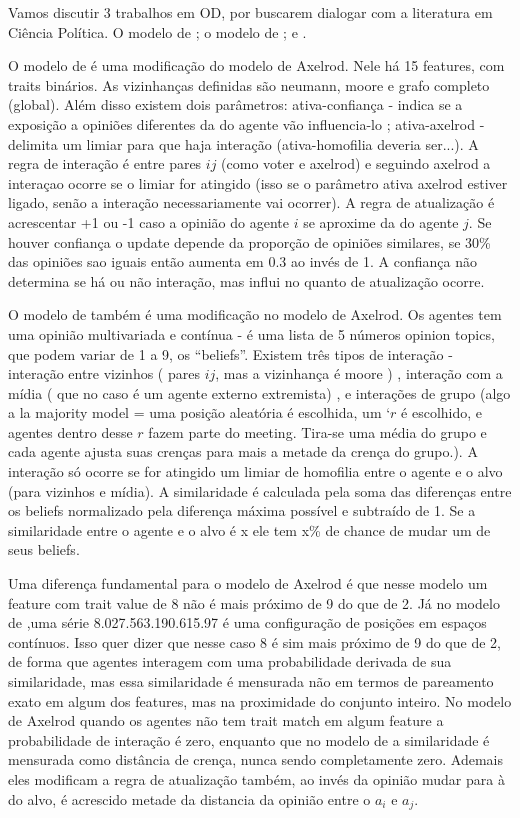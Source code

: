 Vamos discutir 3 trabalhos em OD, por buscarem dialogar com a literatura em Ciência
Política. O modelo de ; o modelo de
 ; e .


O modelo de  é uma modificação do modelo de Axelrod. Nele
há 15 features, com traits binários. As vizinhanças definidas são neumann, moore
e grafo completo (global). Além disso existem dois parâmetros: ativa-confiança -
indica se a exposição a opiniões diferentes da do agente vão influencia-lo ;
ativa-axelrod - delimita um limiar para que haja interação (ativa-homofilia
deveria ser...). A regra de interação é entre pares $ij$ (como voter e axelrod)
e seguindo axelrod a interaçao ocorre se o limiar for atingido (isso se o
parâmetro ativa axelrod estiver ligado, senão a interação necessariamente vai
ocorrer). A regra de atualização é acrescentar +1 ou -1 caso a opinião do agente
$i$ se aproxime da do agente $j$. Se houver confiança o update depende da
proporção de opiniões similares, se 30\% das opiniões sao iguais então aumenta
em 0.3 ao invés de 1. A confiança não determina se há ou não interação, mas
influi no quanto de atualização ocorre.

O modelo de  também é uma modificação no modelo de
Axelrod. Os agentes tem uma opinião multivariada e contínua - é uma lista de 5
números opinion topics, que podem variar de 1 a 9, os ``beliefs''. Existem três
tipos de interação - interação entre vizinhos ( pares $ij$, mas a vizinhança é
moore ) , interação com a mídia ( que no caso é um agente externo extremista) ,
e interações de grupo (algo a la majority model = uma posição aleatória é
escolhida, um `$r$ é escolhido, e agentes dentro desse $r$ fazem parte do
meeting. Tira-se uma média do grupo e cada agente ajusta suas crenças para mais
a metade da crença do grupo.). A interação só ocorre se for atingido um limiar
de homofilia entre o agente e o alvo (para vizinhos e mídia). A similaridade é
calculada pela soma das diferenças entre os beliefs normalizado pela diferença
máxima possível e subtraído de 1. Se a similaridade entre o agente e o alvo é x
ele tem x\% de chance de mudar um de seus beliefs.

Uma diferença fundamental para o modelo de Axelrod é que nesse modelo um feature
com trait value de 8 não é mais próximo de 9 do que de 2. Já no modelo de
 ,uma série 8.027.563.190.615.97 é uma configuração de
posições em espaços contínuos. Isso quer dizer que nesse caso 8 é sim mais
próximo de 9 do que de 2, de forma que agentes interagem com uma probabilidade
derivada de sua similaridade, mas essa similaridade é mensurada não em termos de
pareamento exato em algum dos features, mas na proximidade do conjunto inteiro.
No modelo de Axelrod quando os agentes não tem trait match em algum feature a
probabilidade de interação é zero, enquanto que no modelo de
 a similaridade é mensurada como distância de crença,
nunca sendo completamente zero. Ademais eles modificam a regra de atualização
também, ao invés da opinião mudar para à do alvo, é acrescido metade da
distancia da opinião entre o $a_i$ e $a_j$.


